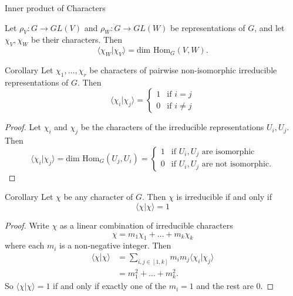 \begin{frame}{Inner product of Characters}
\begin{theorem}
Let $\rho_V \colon G \to GL(V)$ and $\rho_W \colon G \to GL(W)$ be representations of $G$, and let $\chi_V, \chi_W$ be their characters.  Then 
\[ \langle \chi_W | \chi_V \rangle = \text{dim Hom}_G (V,W). \]
\end{theorem}
\end{frame}

\begin{frame}
\begin{block}{Corollary}
Let $\chi_1, \ldots, \chi_r$ be characters of pairwise non-isomorphic irreducible representations of $G$.  Then
\[ \langle \chi_i | \chi_j \rangle = \begin{cases}  1 &\text{if } i = j \\ 0 &\text{if } i \neq j\end{cases} \]
\end{block}
\begin{proof}
Let $\chi_i$ and $\chi_j$ be the characters of the irreducible representations $U_i, U_j$.  Then
\[ \langle \chi_i | \chi_j \rangle = \text{dim Hom}_G (U_j, U_i) = \begin{cases}  1 &\text{if }U_i, U_j \text{ are isomorphic} \\  0 &\text{if }U_i, U_j \text{ are not isomorphic}. \end{cases} \]
\end{proof}
\end{frame}

\begin{frame}
\begin{block}{Corollary}
Let $\chi$ be any character of $G$.    Then $\chi$ is irreducible if and only if \[ \langle \chi | \chi \rangle = 1\]
\end{block}
\begin{proof}
Write $\chi$ as a linear combination of irreducible characters \[ \chi = m_1 \chi_1 + \ldots + m_k \chi_k \] where each $m_i$ is a non-negative integer.  Then
\begin{align*}
\langle \chi | \chi \rangle &= \sum_{i,j \in [1, k]} m_i m_j \langle \chi_i | \chi_j \rangle \\
&= m_1^2 + \ldots + m_k^2.
\end{align*}
So $\langle \chi | \chi \rangle = 1$ if and only if exactly one of the $m_i = 1$ and the rest are $0$.
\end{proof}
\end{frame}

